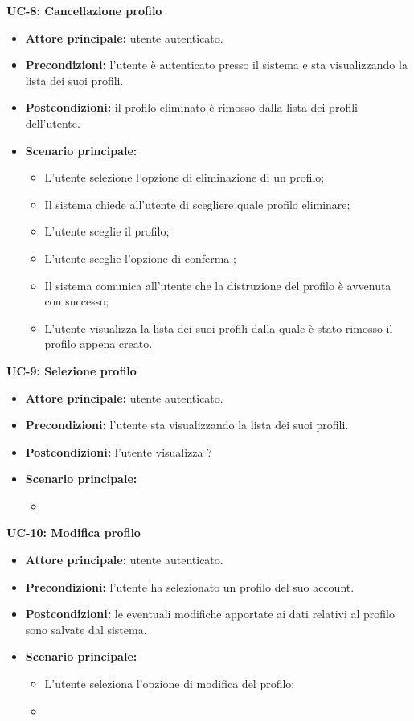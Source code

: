 \textbf{UC-8: Cancellazione profilo}
\begin{itemize}
\item \textbf{Attore principale:} utente autenticato.
\item \textbf{Precondizioni:} l'utente è autenticato presso il sistema e sta visualizzando la lista dei suoi profili.
\item \textbf{Postcondizioni:} il profilo eliminato è rimosso dalla lista dei profili dell'utente.
\item \textbf{Scenario principale:}
\begin{itemize}
    \item L'utente selezione l'opzione di eliminazione di un profilo;
    \item Il sistema chiede all'utente di scegliere quale profilo eliminare;
    \item L'utente sceglie il profilo;
    \item L'utente sceglie l'opzione di conferma ;
    \item Il sistema comunica all'utente che la distruzione del profilo è avvenuta con successo;
    \item L'utente visualizza la lista dei suoi profili dalla quale è stato rimosso il profilo appena creato.
\end{itemize}
\end{itemize}

\textbf{UC-9: Selezione profilo}
\begin{itemize}
\item \textbf{Attore principale:} utente autenticato.
\item \textbf{Precondizioni:} l'utente sta visualizzando la lista dei suoi profili.
\item \textbf{Postcondizioni:} l'utente visualizza ?
\item \textbf{Scenario principale:}
\begin{itemize}
    \item 
\end{itemize}
\end{itemize}

\textbf{UC-10: Modifica profilo}
\begin{itemize}
\item \textbf{Attore principale:} utente autenticato.
\item \textbf{Precondizioni:} l'utente ha selezionato un profilo del suo account.
\item \textbf{Postcondizioni:} le eventuali modifiche apportate ai dati relativi al profilo sono salvate dal sistema.
\item \textbf{Scenario principale:}
\begin{itemize}
    \item L'utente seleziona l'opzione di modifica del profilo;
    \item 
\end{itemize}
\end{itemize}

